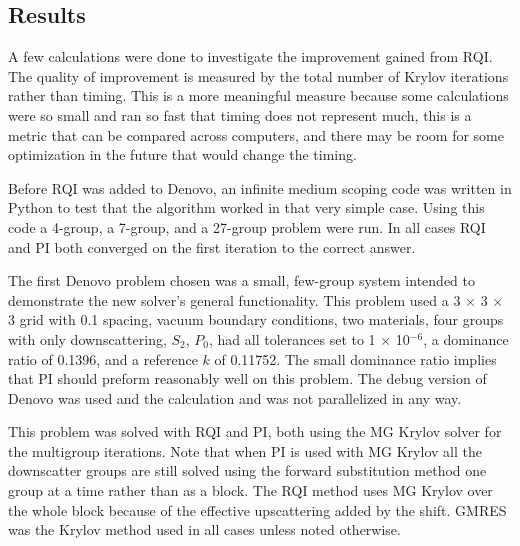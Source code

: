 \subsection{Results}
A few calculations were done to investigate the improvement gained from RQI. The quality of improvement is measured by the total number of Krylov iterations rather than timing. This is a more meaningful measure because some calculations were so small and ran so fast that timing does not represent much, this is a metric that can be compared across computers, and there may be room for some optimization in the future that would change the timing. 

Before RQI was added to Denovo, an infinite medium scoping code was written in Python to test that the algorithm worked in that very simple case.  Using this code a 4-group, a 7-group, and a 27-group problem were run. In all cases RQI and PI both converged on the first iteration to the correct answer. 

The first Denovo problem chosen was a small, few-group system intended to demonstrate the new solver's general functionality. This problem used a 3 $\times$ 3 $\times$ 3 grid with 0.1 spacing, vacuum boundary conditions, two materials, four groups with only downscattering, $S_{2}$, $P_{0}$, had all tolerances set to 1 $\times$ 10$^{-6}$, a dominance ratio of 0.1396, and a reference $k$ of 0.11752. The small dominance ratio implies that PI should preform reasonably well on this problem. The debug version of Denovo was used and the calculation and was not parallelized in any way. 

This problem was solved with RQI and PI, both using the MG Krylov solver for the multigroup iterations. Note that when PI is used with MG Krylov all the downscatter groups are still solved using the forward substitution method one group at a time rather than as a block. The RQI method uses MG Krylov over the whole block because of the effective upscattering added by the shift. GMRES was the Krylov method used in all cases unless noted otherwise.

